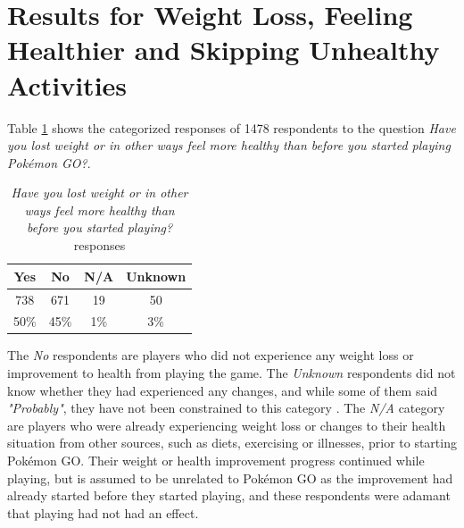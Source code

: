 

\section{Results for Weight Loss, Feeling Healthier and Skipping Unhealthy Activities}

Table \ref{tbl:lost-weight-or-feeling-healthier} shows the categorized responses of 1478 respondents to the question \emph{Have you lost weight or in other ways feel more healthy than before you started playing Pokémon GO?}.

\begin{table}[h]
	\centering
	\caption{\emph{Have you lost weight or in other ways feel more healthy than before you started playing?} responses}
	\label{tbl:lost-weight-or-feeling-healthier}
	\begin{tabular}{|c|c|c|c|}
		\hline
		\textbf{Yes}	& \textbf{No}	& \textbf{N/A}	& \textbf{Unknown}\\
		\hline\hline
		738		& 671	& 19	& 50\\
		50\%	& 45\%	& 1\%	& 3\%\\\hline
	\end{tabular}
\end{table}

The \emph{No} respondents are players who did not experience any weight loss or improvement to health from playing the game. The \emph{Unknown} respondents did not know whether they had experienced any changes, and while some of them said \emph{"Probably"}, they have not been constrained to this category . The \emph{N/A} category are players who were already experiencing weight loss or changes to their health situation from other sources, such as diets, exercising or illnesses, prior to starting Pokémon GO. Their weight or health improvement progress continued while playing, but is assumed to be unrelated to Pokémon GO as the improvement had already started before they started playing, and these respondents were adamant that playing had not had an effect.

